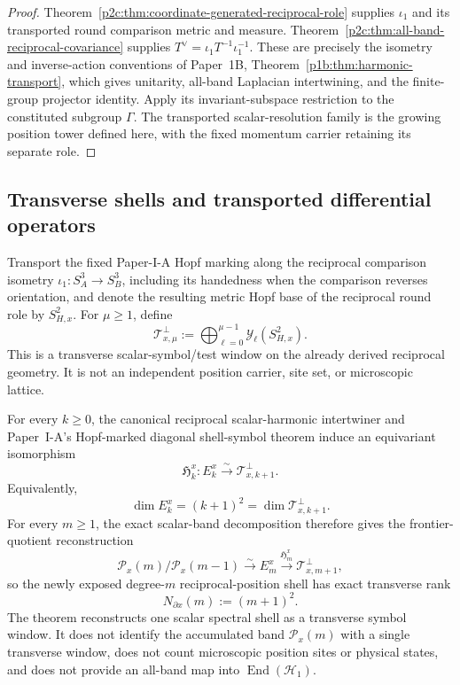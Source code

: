 \documentclass[12pt,a4paper]{article}
\begin{document}
\begin{proof}
Theorem~\ref{p2c:thm:coordinate-generated-reciprocal-role} supplies
$\iota_1$ and its transported round comparison metric and measure.
Theorem~\ref{p2c:thm:all-band-reciprocal-covariance} supplies
$T^\vee=\iota_1T^{-1}\iota_1^{-1}$. These are precisely the isometry and
inverse-action conventions of Paper~1B,
Theorem~\ref{p1b:thm:harmonic-transport}, which gives unitarity, all-band
Laplacian intertwining, and the finite-group projector identity.
Apply its invariant-subspace restriction to the constituted subgroup
$\Gamma$. The transported scalar-resolution family is the growing position tower defined
here, with the fixed momentum carrier retaining its separate role.
\end{proof}

\subsection{Transverse shells and transported differential operators}

\begin{definition}
\label{p2c:def:born-derived-transverse-shell-windows}
Transport the fixed Paper-I-A Hopf marking along the reciprocal comparison
isometry \(\iota_1:S_A^3\to S_B^3\), including its handedness when the
comparison reverses orientation, and denote the resulting metric Hopf base of
the reciprocal round role by \(S^2_{H,x}\).  For \(\mu\ge1\), define
\[
 \boxed{\mathcal T_{x,\mu}^{\perp}
 :=\bigoplus_{\ell=0}^{\mu-1}\mathscr Y_\ell(S^2_{H,x}).}
\]
This is a transverse scalar-symbol/test window on the already derived
reciprocal geometry.  It is not an independent position carrier, site set, or
microscopic lattice.
\end{definition}

\begin{theorem}
\label{p2c:thm:born-transported-transverse-shell-reconstruction}
For every \(k\ge0\), the canonical reciprocal scalar-harmonic intertwiner and
Paper~I-A's Hopf-marked diagonal shell-symbol theorem induce an equivariant
isomorphism
\[
 \boxed{\mathfrak H_k^x:
 E_k^x\xrightarrow{\sim}\mathcal T_{x,k+1}^{\perp}.}
\]
Equivalently,
\[
 \boxed{\dim E_k^x=(k+1)^2
 =\dim\mathcal T_{x,k+1}^{\perp}.}
\]
For every \(m\ge1\), the exact scalar-band decomposition therefore gives the
frontier-quotient reconstruction
\[
 \boxed{
 \mathcal P_x(m)/\mathcal P_x(m-1)
 \xrightarrow{\sim}
 E_m^x
 \xrightarrow{\mathfrak H_m^x}
 \mathcal T_{x,m+1}^{\perp},}
\]
so the newly exposed degree-\(m\) reciprocal-position shell has exact
transverse rank
\[
 \boxed{N_{\partial x}(m):=(m+1)^2.}
\]
The theorem reconstructs one scalar spectral shell as a transverse symbol
window.  It does not identify the accumulated band \(\mathcal P_x(m)\) with a
single transverse window, does not count microscopic position sites or
physical states, and does not provide an all-band map into
\(\operatorname{End}(\mathcal H_1)\).
\end{theorem}
\end{document}
